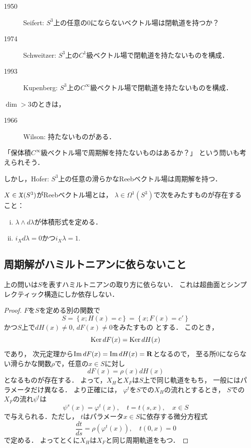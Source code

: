 \begin{description}
    \item[1950] Seifert: \(S^3\)上の任意の0にならないベクトル場は閉軌道を持つか？
    \item[1974] Schweitzer: \(S^3\)上の\(C^1\)級ベクトル場で閉軌道を持たないものを構成．
    \item[1993] Kupenberg: \(S^3\)上の\(C^\infty\)級ベクトル場で閉軌道を持たないものを構成．
\end{description}

\(\dim>3\)のときは，
\begin{description}
    \item[1966] Wilson: 持たないものがある．
\end{description}

「保体積\(C^\infty\)級ベクトル場で周期解を持たないものはあるか？」
という問いも考えられそう．

しかし，Hofer: \(S^3\)上の任意の滑らかなReebベクトル場は周期解を持つ．

\begin{DFN}
    \(X\in\mathfrak{X}(S^3)\)がReebベクトル場とは，
    \(\lambda\in\Omega^1(S^3)\)で次をみたすものが存在すること：
    \begin{enumerate}[(i)]
        \item \(\lambda\wedge d\lambda\)が体積形式を定める．
        \item \(i_{X}d\lambda=0\)かつ\(i_{X}\lambda=1.\)
    \end{enumerate}
\end{DFN}

\subsection*{周期解がハミルトニアンに依らないこと}

上の問いは\(S\)を表すハミルトニアンの取り方に依らない．
これは超曲面とシンプレクティック構造にしか依存しない．

\begin{proof}
    \(F\)を\(S\)を定める別の関数で
    \[
        S=
        \left\{x; H(x)=c\right\}
        =
        \left\{x; F(x)=c'\right\}
    \]
    かつ\(S\)上で\(dH(x)\ne0\), \(dF(x)\ne0\)をみたすもの
    とする．
    このとき，\[
        \mathop{\mathrm{Ker}}\nolimits{dF(x)}=\mathop{\mathrm{Ker}}\nolimits{dH(x)}
    \]であり，
    次元定理から\(\mathop{\mathrm{Im}}\nolimits{dF(x)}=\mathop{\mathrm{Im}}\nolimits{dH(x)}=\mathbf{R}\)となるので，
    至る所\(0\)にならない滑らかな関数\(\rho\)で，任意の\(x\in S\)に対し\[
        dF(x)=\rho(x)dH(x)
    \]となるものが存在する．
    よって，\(X_H\)と\(X_F\)は\(S\)上で同じ軌道をもち，
    一般にはパラメータだけ異なる．
    より正確には，
    \(\varphi^t\)を\(S\)での\(X_H\)の流れとするとき，
    \(S\)での\(X_F\)の流れ\(\psi^t\)は\[
        \psi^s(x)=\varphi^{t}(x),\quad
        t=t(s,x),
        \quad
        x\in S
    \]で与えられる．ただし，
    \(t\)はパラメータ\(x\in S\)に依存する微分方程式\[
        \frac{dt}{ds}=\rho\left(\varphi^t(x)\right),\quad
        t(0,x)=0
    \]で定める．
    よってとくに\(X_H\)は\(X_F\)と同じ周期軌道をもつ．
\end{proof}


